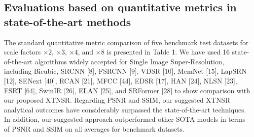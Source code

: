 \documentclass[twocolumn]{svjour3}          %
\begin{document}
\subsection{Evaluations based on quantitative metrics in state-of-the-art methods}
The standard quantitative metric comparison of five benchmark test datasets for scale factors $\times2$, $\times3$, $\times4$, and $\times8$  is presented in Table 1. We have used 16 state-of-the-art algorithms widely accepted for Single Image Super-Resolution, including Bicubic, SRCNN [8], FSRCNN [9], VDSR [10], MemNet [15], LapSRN [12], SENext [40], RCAN [21], MFCC [44], EDSR [17], HAN [24], NLSN [23], ESRT [64], SwinIR [26], ELAN [25], and SRFormer [28] to show comparison with our proposed XTNSR. Regarding  PSNR and SSIM, our suggested XTNSR analytical outcomes have considerably surpassed the state-of-the-art techniques. In addition, our suggested approach outperformed other SOTA models in terms of PSNR and SSIM on all averages for benchmark datasets.
\end{document}
